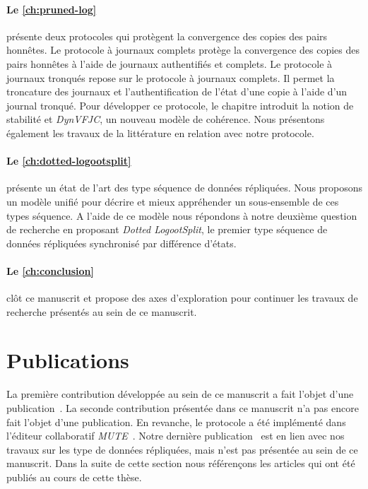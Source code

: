 \paragraph{Le \autoref{ch:pruned-log}} présente deux protocoles qui protègent la convergence des copies des pairs honnêtes.
Le protocole à journaux complets protège la convergence des copies des pairs honnêtes à l'aide de journaux authentifiés et complets.
Le protocole à journaux tronqués repose sur le protocole à journaux complets.
Il permet la troncature des journaux et l'authentification de l'état d'une copie à l'aide d'un journal tronqué.
Pour développer ce protocole, le chapitre introduit la notion de stabilité et \emph{DynVFJC}, un nouveau modèle de cohérence.
Nous présentons également les travaux de la littérature en relation avec notre protocole.

\paragraph{Le \autoref{ch:dotted-logootsplit}} présente un état de l'art des type séquence de données répliquées.
Nous proposons un modèle unifié pour décrire et mieux appréhender un sous-ensemble de ces types séquence.
A l'aide de ce modèle nous répondons à notre deuxième question de recherche en proposant \emph{Dotted LogootSplit}, le premier type séquence de données répliquées synchronisé par différence d'états.

\paragraph{Le \autoref{ch:conclusion}} clôt ce manuscrit et propose des axes d'exploration pour continuer les travaux de recherche présentés au sein de ce manuscrit.


\section{Publications}

La première contribution développée au sein de ce manuscrit a fait l'objet d'une publication~\autocite{2018_elvinger_prunable-auth-log}.
La seconde contribution présentée dans ce manuscrit n'a pas encore fait l'objet d'une publication.
En revanche, le protocole a été implémenté dans l'éditeur collaboratif \emph{MUTE}~\autocite{2017_nicolas-mute-demo}.
Notre dernière publication~\autocite{2019_yu_genericundo} est en lien avec nos travaux sur les type de données répliquées, mais n'est pas présentée au sein de ce manuscrit.
Dans la suite de cette section nous référençons les articles qui ont été publiés au cours de cette thèse.

